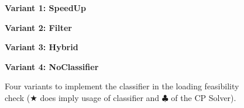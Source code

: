 \begin{figure}[ht]
    \centering

    \begin{minipage}[t]{0.45\textwidth}
        \textbf{Variant 1: SpeedUp}\par\vspace{0.5ex}
        \begin{algorithmic}[1]
            \EndWhile
        \end{algorithmic}
    \end{minipage}
    \hfill
    \begin{minipage}[t]{0.45\textwidth}
        \textbf{Variant 2: Filter}\par\vspace{0.5ex}
        \begin{algorithmic}[1]
            \EndWhile
        \end{algorithmic}
    \end{minipage}

    \vspace{2em} %

    \begin{minipage}[t]{0.45\textwidth}
        \textbf{Variant 3: Hybrid}\par\vspace{0.5ex}
        \begin{algorithmic}[1]
            \EndWhile
        \end{algorithmic}
    \end{minipage}
    \hfill
    \begin{minipage}[t]{0.45\textwidth}
        \textbf{Variant 4: NoClassifier}\par\vspace{0.5ex}
        \begin{algorithmic}[1]
            \EndWhile
        \end{algorithmic}
    \end{minipage}

    \vspace{1em}

    \caption[Four variants to implement the classifier in the loading feasibility check.]{Four variants to implement the classifier in the loading feasibility check ($\bigstar$
        does imply usage of classifier and $\clubsuit$ of the CP Solver).}
    \label{fig:four_variants}
\end{figure}

